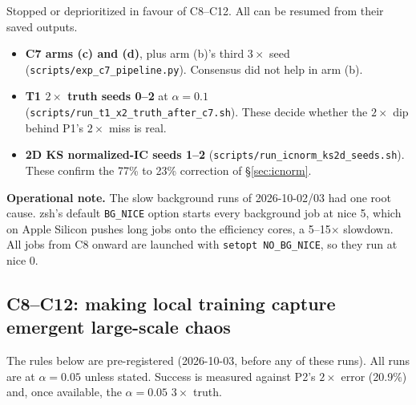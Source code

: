 \documentclass[11pt]{article}
\begin{document}
Stopped or deprioritized in favour of C8--C12. All can be resumed from
their saved outputs.
\begin{itemize}[leftmargin=*]
\item \textbf{C7 arms (c) and (d)}, plus arm (b)'s third $3\times$ seed
  (\texttt{scripts/exp\_c7\_pipeline.py}). Consensus did not help in arm
  (b).
\item \textbf{T1 $2\times$ truth seeds 0--2} at $\alpha{=}0.1$
  (\texttt{scripts/run\_t1\_x2\_truth\_after\_c7.sh}). These decide
  whether the $2\times$ dip behind P1's $2\times$ miss is real.
\item \textbf{2D KS normalized-IC seeds 1--2}
  (\texttt{scripts/run\_icnorm\_ks2d\_seeds.sh}). These confirm the 77\%
  to 23\% correction of \S\ref{sec:icnorm}.
\end{itemize}

\textbf{Operational note.} The slow background runs of 2026-10-02/03 had
one root cause. zsh's default \texttt{BG\_NICE} option starts every
background job at nice 5, which on Apple Silicon pushes long jobs onto
the efficiency cores, a 5--15$\times$ slowdown. All jobs from C8 onward
are launched with \texttt{setopt NO\_BG\_NICE}, so they run at nice 0.

\subsection{C8--C12: making local training capture emergent large-scale chaos}
\label{sec:c8c12}

The rules below are pre-registered (2026-10-03, before any of these
runs). All runs are at $\alpha{=}0.05$ unless stated. Success is measured
against P2's $2\times$ error (20.9\%) and, once available, the
$\alpha{=}0.05$ $3\times$ truth.
\end{document}
